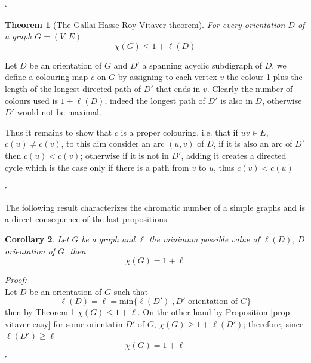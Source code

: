 \documentclass[a4paper,12pt,twoside]{book}
\newtheorem{theorem}{Theorem}[chapter]
\newtheorem{corollary}[theorem]{Corollary}
\newcommand*{\QED}{\hfill\ensuremath{\square}}
\begin{document}
 \QED
\newpage
\begin{theorem}[The Gallai-Hasse-Roy-Vitaver theorem]\label{vitaver}
For every orientation $D$ of a graph $G=(V,E)$ $$\chi (G)\leq 1 + \ell(D)$$
\end{theorem}
Let $D$ be an orientation of $G$ and $D'$ a spanning acyclic subdigraph of $D$, we define a colouring map $c$ on $G$ by assigning to each vertex $v$ the colour 1 plus the length of the longest directed path of $D'$ that ends in $v$. Clearly the number of colours used is $1+\ell(D)$, indeed the longest path of $D'$ is also in $D$, otherwise $D'$ would not be maximal. 

Thus it remains to show that $c$ is a proper colouring, i.e. that if $uv\in E$, $c(u)\neq c(v) $, to this aim consider an arc $(u,v)$ of $D$, if it is also an arc of $D'$ then $c(u)<c(v)$; otherwise if it is not in $D'$, adding it creates a directed cycle which is the case only if there is a path from $v$ to $u$, thus $c(v)<c(u)$ 

\QED

\noindent The following result characterizes the chromatic number of a simple graphs and is a direct consequence of the last propositions.
\begin{corollary}\label{cor-vitaver}
Let $G$ be a graph and $\ell$ the minimum possible value of $\ell(D)$, $D$ orientation of $G$, then   
$$\chi (G)=1+\ell$$
\end{corollary}

\noindent\textit{Proof:}\\
Let $D$ be an orientation of $G$ such that 
$$\ell(D)=\ell=\textrm{min}\{\ell(D') \; 	,D' \textrm{ orientation of } G\}$$ 
then by Theorem \ref{vitaver} $\chi(G) \leq 1+\ell$. On the other hand by Proposition \ref{prop-vitaver-easy} for some orientatin $D'$  of $G$, $\chi(G)\geq 1+\ell(D')$; therefore, since $\ell(D')\geq\ell$ 
$$\chi (G)=1+\ell$$ \QED
\end{document}
